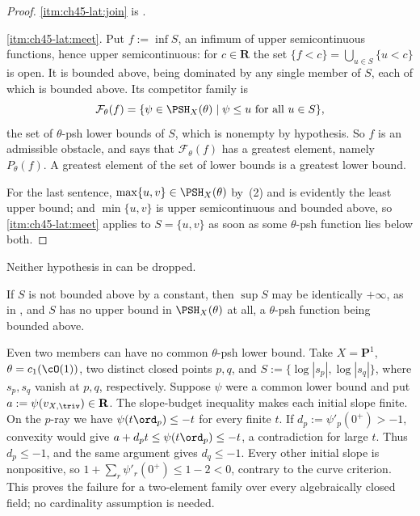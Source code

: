 \begin{proof}
\cref{itm:ch45-lat:join} is .

\cref{itm:ch45-lat:meet}.  Put $f:=\inf S$, an infimum of upper
semicontinuous functions, hence upper semicontinuous: for $c\in\mathbf R$
the set $\{f<c\}=\bigcup_{u\in S}\{u<c\}$ is open.  It is bounded above,
being dominated by any single member of $S$, each of which is bounded
above.  Its competitor family is
\[
 \mathcal F_\theta(f)=\{\psi\in\PSH_X(\theta)\mid\psi\le u\ \text{for all }u\in S\},
\]
the set of $\theta$-psh lower bounds of $S$, which is nonempty by
hypothesis.  So $f$ is an admissible obstacle, and
 says that $\mathcal F_\theta(f)$ has a greatest
element, namely $P_\theta(f)$.  A greatest element of the set of lower
bounds is a greatest lower bound.

For the last sentence, $\max\{u,v\}\in\PSH_X(\theta)$ by
\,(2) and is evidently the least upper bound;
and $\min\{u,v\}$ is upper semicontinuous and bounded above, so
\cref{itm:ch45-lat:meet} applies to $S=\{u,v\}$ as soon as some
$\theta$-psh function lies below both.
\end{proof}

\begin{remark}
\label{rem:ch45-lattice-conditions}
Neither hypothesis in  can be dropped.

If $S$ is not bounded above by a constant, then $\sup S$ may be
identically $+\infty$, as in , and
$S$ has no upper bound in $\PSH_X(\theta)$ at all, a $\theta$-psh
function being bounded above.

Even two members can have no common $\theta$-psh lower bound.
Take $X=\mathbf P^1$, $\theta=c_1(\cO(1))$, two distinct closed points
$p,q$, and $S:=\{\log|s_p|,\log|s_q|\}$, where $s_p,s_q$ vanish at
$p,q$, respectively.  Suppose $\psi$ were a common lower bound and put
$a:=\psi(v_{X,\triv})\in\mathbf R$.  The slope-budget inequality makes
each initial slope finite.
On the $p$-ray we have $\psi(t\ord_p)\le-t$ for every finite $t$.
If $d_p:=\psi'_p(0^+)>-1$, convexity would give
$a+d_pt\le\psi(t\ord_p)\le-t$, a contradiction for large $t$.
Thus $d_p\le-1$, and the same argument gives $d_q\le-1$.
Every other initial slope is nonpositive, so
$1+\sum_r\psi'_r(0^+)\le1-2<0$, contrary to the curve criterion.
This proves the failure for a two-element family over every algebraically
closed field; no cardinality assumption is needed.
\end{remark}

